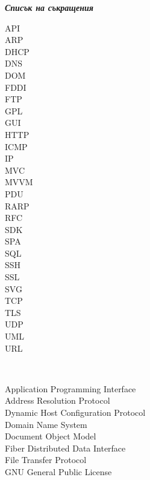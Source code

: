 \documentclass[12pt,a4paper,oneside]{book}
\begin{document}
\newpage
\begin{flushleft}
\begin{Large}
\emph{\bf Списък на съкращения}\\
\end{Large}
\end{flushleft}
\begin{spacing}{1.241}
\vspace{10mm}
\begin{minipage}{0.2\textwidth}
\begin{flushleft} \normalsize
API\\
ARP\\
DHCP\\
DNS\\
DOM\\
FDDI\\
FTP\\
GPL\\
GUI\\
HTTP\\
ICMP\\
IP\\
MVC\\
MVVM\\
PDU\\
RARP\\
RFC\\
SDK\\
SPA\\
SQL\\
SSH\\
SSL\\
SVG\\
TCP\\
TLS\\
UDP\\
UML\\
URL\\
\end{flushleft}
\end{minipage}
~
\begin{minipage}{0.5\textwidth}
\begin{flushleft} \normalsize
Application Programming Interface\\
Address Resolution Protocol\\
Dynamic Host Configuration Protocol\\
Domain Name System\\
Document Object Model\\
Fiber Distributed Data Interface\\
File Transfer Protocol\\
GNU General Public License\\

\end{flushleft}
\end{minipage}
\end{spacing}
\end{document}
